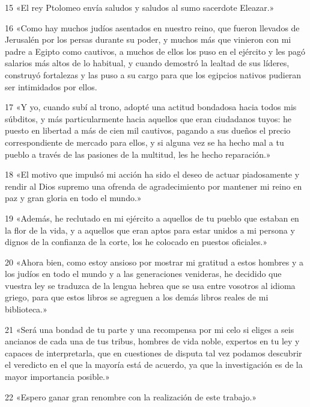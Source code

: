 \par 15 «El rey Ptolomeo envía saludos y saludos al sumo sacerdote Eleazar.»

\par 16 «Como hay muchos judíos asentados en nuestro reino, que fueron llevados de Jerusalén por los persas durante su poder, y muchos más que vinieron con mi padre a Egipto como cautivos, a muchos de ellos los puso en el ejército y les pagó salarios más altos de lo habitual, y cuando demostró la lealtad de sus líderes, construyó fortalezas y las puso a su cargo para que los egipcios nativos pudieran ser intimidados por ellos.

\par 17 «Y yo, cuando subí al trono, adopté una actitud bondadosa hacia todos mis súbditos, y más particularmente hacia aquellos que eran ciudadanos tuyos: he puesto en libertad a más de cien mil cautivos, pagando a sus dueños el precio correspondiente de mercado para ellos, y si alguna vez se ha hecho mal a tu pueblo a través de las pasiones de la multitud, les he hecho reparación.»

\par 18 «El motivo que impulsó mi acción ha sido el deseo de actuar piadosamente y rendir al Dios supremo una ofrenda de agradecimiento por mantener mi reino en paz y gran gloria en todo el mundo.»

\par 19 «Además, he reclutado en mi ejército a aquellos de tu pueblo que estaban en la flor de la vida, y a aquellos que eran aptos para estar unidos a mi persona y dignos de la confianza de la corte, los he colocado en puestos oficiales.»

\par 20 «Ahora bien, como estoy ansioso por mostrar mi gratitud a estos hombres y a los judíos en todo el mundo y a las generaciones venideras, he decidido que vuestra ley se traduzca de la lengua hebrea que se usa entre vosotros al idioma griego, para que estos libros se agreguen a los demás libros reales de mi biblioteca.»

\par 21 «Será una bondad de tu parte y una recompensa por mi celo si eliges a seis ancianos de cada una de tus tribus, hombres de vida noble, expertos en tu ley y capaces de interpretarla, que en cuestiones de disputa tal vez podamos descubrir el veredicto en el que la mayoría está de acuerdo, ya que la investigación es de la mayor importancia posible.»

\par 22 «Espero ganar gran renombre con la realización de este trabajo.»

